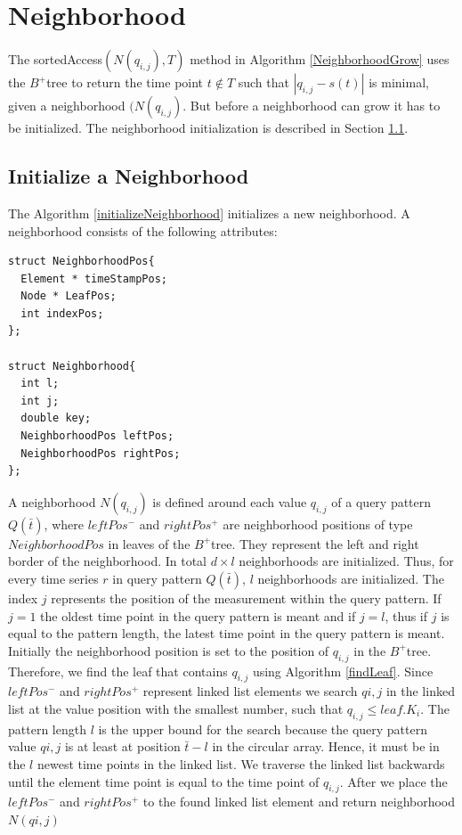 \documentclass[abstracton,12pt,oneside]{scrreprt}
\begin{document}
\section{Neighborhood}

The sortedAccess$(N(q_{i,j}),T)$ method in Algorithm \ref{NeighborhoodGrow} uses the $B^+$tree to return the time point $t \not\in T$ such that $|q_{i,j}-s(t)|$ is minimal, given a neighborhood $(N(q_{i,j})$. But before a neighborhood can grow it has to be initialized. The neighborhood initialization is described in Section \ref{initN}.

\subsection{Initialize a Neighborhood}
\label{initN}
The Algorithm \ref{initializeNeighborhood} initializes a new neighborhood. A neighborhood consists of the following attributes: 
\lstset{language=C}
\begin{lstlisting}
struct NeighborhoodPos{
  Element * timeStampPos;
  Node * LeafPos;
  int indexPos;
};

struct Neighborhood{
  int l;
  int j;
  double key;
  NeighborhoodPos leftPos;
  NeighborhoodPos rightPos;
};
\end{lstlisting}
\BlankLine
A neighborhood $N(q_{i,j})$ is defined around each value $q_{i,j}$ of a query pattern $Q(\bar{t})$, where $leftPos^-$ and $rightPos^+$ are neighborhood positions of type $NeighborhoodPos$ in leaves of the $B^+$tree. They represent the left and right border of the neighborhood.  In total $d \times l$ neighborhoods are initialized. Thus, for every time series $r$ in query pattern $Q(\bar{t})$, $l$ neighborhoods are initialized. The index $j$ represents the position of the measurement within the query pattern. If $j=1$ the oldest time point in the query pattern is meant and if $j=l$, thus if $j$ is equal to the pattern length, the latest time point in the query pattern is meant. \\
Initially the neighborhood position is set to the position of $q_{i,j}$ in the $B^+$tree. Therefore, we find the leaf that contains $q_{i,j}$ using Algorithm \ref{findLeaf}. Since $leftPos^-$ and $rightPos^+$ represent linked list elements we search $q{i,j}$ in the linked list at the value position with the smallest number, such that $q_{i,j}\leq leaf.K_i$. The pattern length $l$ is the upper bound for the search because the query pattern value $q{i,j}$ is at least at position $\bar{t}-l$ in the circular array. Hence, it must be in the $l$ newest time points in the linked list. We traverse the linked list backwards until the element time point is equal to the time point of $q_{i,j}$. After we place the $leftPos^-$ and $rightPos^+$ to the found linked list element and return neighborhood $N(q{i,j})$
\end{document}
